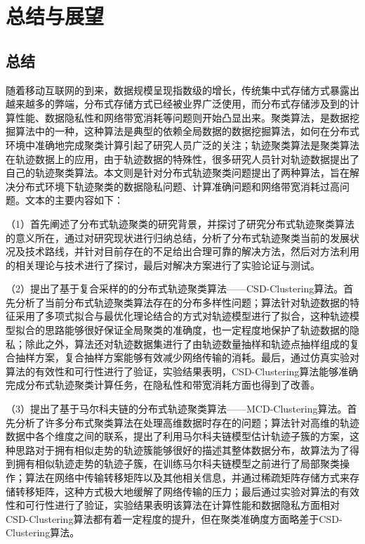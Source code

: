 \chapter{总结与展望}

\section{总结}

随着移动互联网的到来，数据规模呈现指数级的增长，传统集中式存储方式暴露出越来越多的弊端，分布式存储方式已经被业界广泛使用，而分布式存储涉及到的计算性能、数据隐私性和网络带宽消耗等问题则开始凸显出来。聚类算法，是数据挖掘算法中的一种，这种算法是典型的依赖全局数据的数据挖掘算法，如何在分布式环境中准确地完成聚类计算引起了研究人员广泛的关注；轨迹聚类算法是聚类算法在轨迹数据上的应用，由于轨迹数据的特殊性，很多研究人员针对轨迹数据提出了自己的轨迹聚类算法。本文则是针对分布式轨迹聚类问题提出了两种算法，旨在解决分布式环境下轨迹聚类的数据隐私问题、计算准确问题和网络带宽消耗过高问题。文本的主要内容如下：

（1）首先阐述了分布式轨迹聚类的研究背景，并探讨了研究分布式轨迹聚类算法的意义所在，通过对研究现状进行归纳总结，分析了分布式轨迹聚类当前的发展状况及技术路线，并针对目前存在的不足给出合理可靠的解决方法，然后对方法利用的相关理论与技术进行了探讨，最后对解决方案进行了实验论证与测试。

（2）提出了基于复合采样的的分布式轨迹聚类算法——CSD-Clustering算法。首先分析了当前分布式轨迹聚类算法存在的分布多样性问题；算法针对轨迹数据的特征采用了多项式拟合与最优化理论结合的方式对轨迹模型进行了拟合，这种轨迹模型拟合的思路能够很好保证全局聚类的准确度，也一定程度地保护了轨迹数据的隐私；除此之外，算法还对轨迹数据集进行了由轨迹数量抽样和轨迹点抽样组成的复合抽样方案，复合抽样方案能够有效减少网络传输的消耗。最后，通过仿真实验对算法的有效性和可行性进行了验证，实验结果表明，CSD-Clustering算法能够准确完成分布式轨迹聚类计算任务，在隐私性和带宽消耗方面也得到了改善。

（3）提出了基于马尔科夫链的分布式轨迹聚类算法——MCD-Clustering算法。首先分析了许多分布式聚类算法在处理高维数据时存在的问题；算法针对高维的轨迹数据中各个维度之间的联系，提出了利用马尔科夫链模型估计轨迹子簇的方案，这种思路对于拥有相似走势的轨迹簇能够很好的描述其整体数据分布，故算法为了得到拥有相似轨迹走势的轨迹子簇，在训练马尔科夫链模型之前进行了局部聚类操作；算法在网络中传输转移矩阵以及其他相关信息，并通过稀疏矩阵存储方式来存储转移矩阵，这种方式极大地缓解了网络传输的压力；最后通过实验对算法的有效性和可行性进行了验证，实验结果表明该算法在计算性能和数据隐私方面相对CSD-Clustering算法都有着一定程度的提升，但在聚类准确度方面略差于CSD-Clustering算法。

